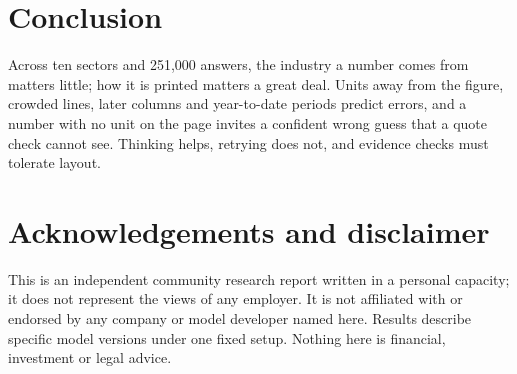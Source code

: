 \documentclass[11pt]{article}
\begin{document}
\section{Conclusion}
Across ten sectors and 251{,}000 answers, the industry a number comes from matters little; how it is printed matters a great deal. Units away from the figure, crowded lines, later columns and year-to-date periods predict errors, and a number with no unit on the page invites a confident wrong guess that a quote check cannot see. Thinking helps, retrying does not, and evidence checks must tolerate layout.

\section*{Acknowledgements and disclaimer}
This is an independent community research report written in a personal capacity; it does not represent the views of any employer. It is not affiliated with or endorsed by any company or model developer named here. Results describe specific model versions under one fixed setup. Nothing here is financial, investment or legal advice.
\end{document}
